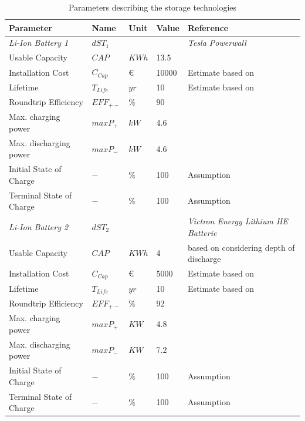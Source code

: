 \documentclass[
	11pt,								%
	DIV10,								%
	a4paper,         					%
	oneside,							%
	headheight=20pt,					%
	footheight=20pt,					%
    parskip=full,						%
    listof=totoc,						%
	bibliography=totoc,					%
	index=totoc,						%
]{scrartcl}
\begin{document}
\begin{table}[H]
	\centering
	\caption{Parameters describing the storage technologies}
	\begin{tabular}{lllll}
		\hline
		\textbf{Parameter}			& \textbf{Name}			& \textbf{Unit}			& \textbf{Value}	&\textbf{Reference}     \\ \hline
		\textit{Li-Ion Battery 1} & $dST_1$ & & &\textit{Tesla Powerwall} \\
		Usable Capacity				   & $CAP$ 		& $KWh$ 				& 13.5 				& \cite{PowerwallTesla2018} 	\\
		Installation Cost              & $C_{Cap}$        	& \euro 				& 10000				& Estimate based on \cite{PowerwallTesla2018}   \\
		Lifetime			               & $T_{Life}$       	& $yr$  				& 10 				& Estimate based on \cite{PowerwallTesla2018} \\
		Roundtrip Efficiency           & $EFF_{+-}$     	& $\%$  				& 90				& \cite{PowerwallTesla2018}   \\
		Max. charging power            & $maxP_+$    	& $kW$  				& 4.6 				& \cite{PowerwallTesla2018}      \\
		Max. discharging power         & $maxP_-$     	& $kW$   				& 4.6 				& \cite{PowerwallTesla2018}      \\
		Initial State of Charge        & $-$     	& $\%$  				& 100 				& Assumption   \\
		Terminal State of Charge       & $-$     	& $\%$  				& 100 				& Assumption   \\
		\hline
		\textit{Li-Ion Battery 2} & $dST_2$ & & & \textit{Victron Energy Lithium HE Batterie} \\
		Usable Capacity				   & $CAP$ 		& $KWh$ 				& 4 				& based on \cite{LithiumIonenHEHigh2018} considering depth of discharge\\
		Installation Cost              & $C_{Cap}$     	& \euro  				& 5000				& Estimate based on \cite{VictronEnergyLithium2018}   \\
		Lifetime			               & $T_{Life}$     	& $yr$  				& 10 				& Estimate based on \cite{LithiumIonenHEHigh2018}   \\
		Roundtrip Efficiency           & $EFF_{+-}$      	& $\%$  				& 92 				& \cite{LAUINGER201624}    \\
		Max. charging power            & $maxP_+$    	& $KW$  				& 4.8				& \cite{LithiumIonenHEHigh2018}    \\
		Max. discharging power         & $maxP_-$     	& $KW$   				& 7.2				& \cite{LithiumIonenHEHigh2018}    \\
		Initial State of Charge        & $-$     	& $\%$  				& 100 				& Assumption	   \\
		Terminal State of Charge       & $-$    	& $\%$  				& 100 				& Assumption   \\	
		\hline
	\end{tabular}
\end{table}
\end{document}
